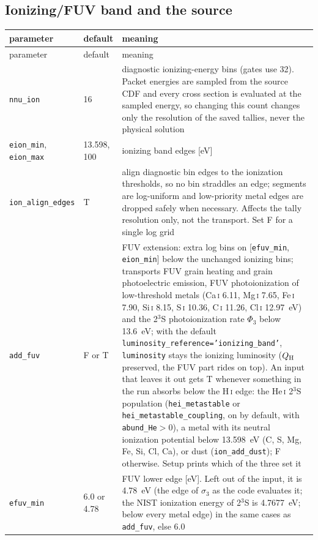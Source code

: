 \documentclass[english,a4paper]{my_memo}
\newcommand{\code}[1]{\texttt{#1}}
\begin{document}
\subsection{Ionizing/FUV band and the source}
{\small
\begin{longtable}{llp{7.2cm}}
\toprule
parameter & default & meaning \\
\midrule
\endfirsthead
\toprule
parameter & default & meaning \\
\midrule
\endhead
\bottomrule
\endlastfoot
\code{nnu\_ion} & 16 & diagnostic ionizing-energy bins (gates use 32).  Packet energies are sampled from the source CDF and every cross section is evaluated at the sampled energy, so changing this count changes only the resolution of the saved tallies, never the physical solution \\
\code{eion\_min}, \code{eion\_max} & 13.598, 100 & ionizing band edges [eV] \\
\code{ion\_align\_edges} & T & align diagnostic bin edges to the ionization thresholds, so no bin straddles an edge; segments are log-uniform and low-priority metal edges are dropped safely when necessary.  Affects the tally resolution only, not the transport.  Set F for a single log grid \\
\code{add\_fuv} & F or T & FUV extension: extra log bins on [\code{efuv\_min}, \code{eion\_min}] below the unchanged ionizing bins; transports FUV grain heating and grain photoelectric emission, FUV photoionization of low-threshold metals (Ca\,\textsc{i} 6.11, Mg\,\textsc{i} 7.65, Fe\,\textsc{i} 7.90, Si\,\textsc{i} 8.15, S\,\textsc{i} 10.36, C\,\textsc{i} 11.26, Cl\,\textsc{i} 12.97~eV) and the 2$^3$S photoionization rate $\Phi_3$ below 13.6~eV; with the default \code{luminosity\_reference='ionizing\_band'}, \code{luminosity} stays the ionizing luminosity ($Q_{\rm H}$ preserved, the FUV part rides on top).  An input that leaves it out gets T whenever something in the run absorbs below the H\,\textsc{i} edge: the He\,\textsc{i} 2$^3$S population (\code{hei\_metastable} or \code{hei\_metastable\_coupling}, on by default, with \code{abund\_He}$>0$), a metal with its neutral ionization potential below 13.598~eV (C, S, Mg, Fe, Si, Cl, Ca), or dust (\code{ion\_add\_dust}); F otherwise.  Setup prints which of the three set it \\
\code{efuv\_min} & 6.0 or 4.78 & FUV lower edge [eV].  Left out of the input, it is 4.78~eV (the edge of $\sigma_3$ as the code evaluates it; the NIST ionization energy of 2$^3$S is 4.7677~eV; below every metal edge) in the same cases as \code{add\_fuv}, else 6.0 \\

\end{longtable}}
\end{document}
